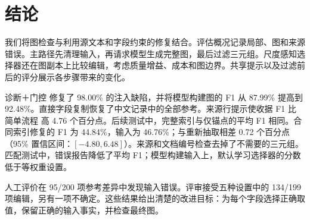 \section{结论}
\label{sec:conclusion}

我们将图检查与利用源文本和字段约束的修复结合。评估概况记录局部、图和来源错误。主路径先清理输入，再请求模型生成完整图，最后过滤三元组。尺度感知选择器还在图副本上比较编辑，考虑质量增益、成本和图边界。共享提示以及过滤前后的评分展示各步骤带来的变化。

诊断＋门控 修复了 98.00\% 的注入缺陷，并将模型构建图的 F1 从 87.99\% 提高到 92.48\%。直接字段复制恢复了中文记录中的全部参考。来源行提示使收据 F1 比 简单流程 高 4.76 个百分点。后续测试中，完整索引与仅锚点的平均 F1 相同。合同索引修复的 F1 为 44.84\%，输入为 46.76\%；与重新抽取相差 0.72 个百分点（95\% 置信区间：$[-4.80,6.48]$）。来源和文档编号检查去掉了不需要的三元组。匹配测试中，错误报告降低了平均 F1；模型构建输入上，默认学习选择器的分数低于等权重设置。

人工评价在 95/200 项参考差异中发现输入错误。评审接受五种设置中的 134/199 项编辑，另有一项不确定。这些结果给出清楚的改进目标：为每个字段选择正确取值，保留正确的输入事实，并检查最终图。